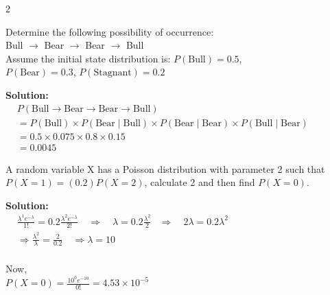 \begin{multicols}{2}
\begin{center}
\end{center}

Determine the following possibility of occurrence:\\
Bull $\rightarrow$ Bear $\rightarrow$ Bear $\rightarrow$ Bull\\[0.5em]
Assume the initial state distribution is: 
$P(\text{Bull}) = 0.5$, \\$P(\text{Bear}) = 0.3$, $P(\text{Stagnant}) = 0.2$

\textbf{Solution:}\\[0.5em]
$\begin{aligned}
&P(\text{Bull} \rightarrow \text{Bear} \rightarrow \text{Bear} \rightarrow \text{Bull})\\
&= P(\text{Bull}) \times P(\text{Bear}\mid \text{Bull}) \times P(\text{Bear}\mid \text{Bear}) \times P(\text{Bull}\mid \text{Bear}) \\
&= 0.5 \times 0.075 \times 0.8 \times 0.15 \\
&= 0.0045
\end{aligned}$

\columnbreak

A random variable X has a Poisson distribution with parameter 2 such
that $P (X = 1) = (0.2) P(X = 2)$, calculate 2 and then find $P(X = 0)$.

\textbf{Solution:}\\[0.5em]
$\begin{aligned}
   &\frac{\lambda^1 e^{-\lambda}}{1!} = 0.2 \frac{\lambda^2 e^{-\lambda}}{2!} \quad \Rightarrow \quad  \lambda = 0.2 \frac{\lambda^2}{2}
   &\Rightarrow \quad 2\lambda = 0.2 \lambda^2 \\[0.5em]
   &\Rightarrow \frac{\lambda^2}{\lambda} =  \frac{2}{0.2}
   \quad \Rightarrow \lambda = 10\\
\end{aligned}$

Now,\\
$P(X=0) = \frac{10^0 e^{-10}}{0!} = 4.53 \times 10^{-5}$
\end{multicols}